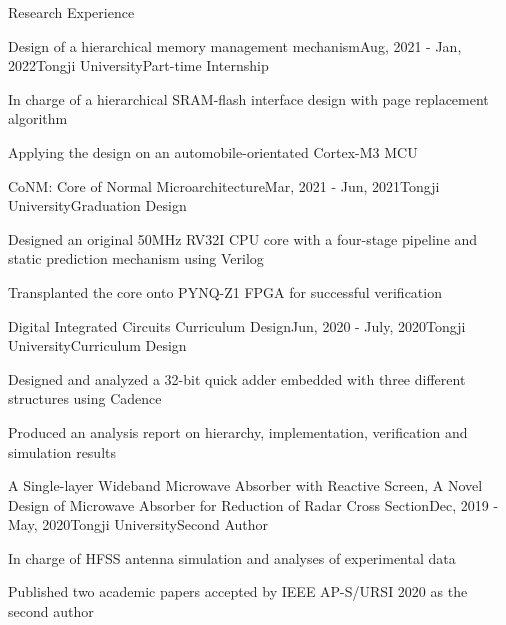 \documentclass{resume} %
\begin{document}
\begin{rSection}{Research Experience}

	\begin{rSubsection}{Design of a hierarchical memory management mechanism}{Aug, 2021 - Jan, 2022}{Tongji University}{Part-time Internship}
		\item In charge of a hierarchical SRAM-flash interface design with page replacement algorithm
		\item Applying the design on an automobile-orientated Cortex-M3 MCU
	\end{rSubsection}
	
	\begin{rSubsection}{CoNM: Core of Normal Microarchitecture}{Mar, 2021 - Jun, 2021}{Tongji University}{Graduation Design}
		\item Designed an original 50MHz RV32I CPU core with a four-stage pipeline and static prediction mechanism using Verilog
		\item Transplanted the core onto PYNQ-Z1 FPGA for successful verification
	\end{rSubsection}

	\begin{rSubsection}{Digital Integrated Circuits Curriculum Design}{Jun, 2020 - July, 2020}{Tongji University}{Curriculum Design}
		\item Designed and analyzed a 32-bit quick adder embedded with three different structures using Cadence
		\item Produced an analysis report on hierarchy, implementation, verification and simulation results 
	\end{rSubsection}

	\begin{rSubsection}{A Single-layer Wideband Microwave Absorber with Reactive Screen, A Novel Design of Microwave Absorber for Reduction of Radar Cross Section}{Dec, 2019 - May, 2020}{Tongji University}{Second Author}
		\item In charge of HFSS antenna simulation and analyses of experimental data
		\item Published two academic papers accepted by IEEE AP-S/URSI 2020 as the second author
	\end{rSubsection}

\end{rSection}
\end{document}
